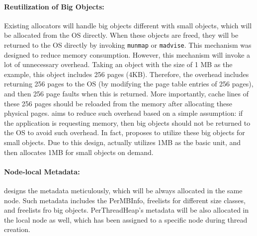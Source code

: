 \paragraph{Reutilization of Big Objects:} Existing allocators will handle big objects different with small objects, which will be allocated from the OS directly. When these objects are freed, they will be returned to the OS directly by invoking \texttt{munmap} or \texttt{madvise}. This mechanism was designed to reduce memory consumption. However, this mechanism will invoke a lot of unnecessary overhead. Taking an object with the size of 1 MB as the example, this object includes 256 pages (4KB). Therefore, the overhead includes returning 256 pages to the OS (by modifying the page table entries of 256 pages), and then 256 page faults when this is returned. More importantly, cache lines of these 256 pages should be reloaded from the memory after allocating these physical pages. \NM{} aims to reduce such overhead based on a simple assumption: if the application is requesting memory, then big objects should not be returned to the OS to avoid such overhead. In fact, \NM{} proposes to utilize these big objects for small objects. Due to this design, \NM{} actually utilizes 1MB as the basic unit, and then allocates 1MB for small objects on demand. 

\paragraph{Node-local Metadata:} \NM{} designs the metadata meticulously, which will be always allocated in the same node. Such metadata includes the PerMBInfo, freelists for different size classes, and freelists fro big objects. PerThreadHeap's metadata will be also allocated in the local node as well, which has been assigned to a specific node during thread creation. 
 